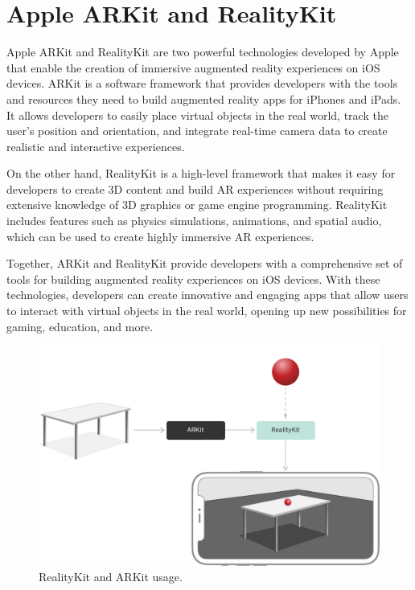 \documentclass[11pt,a4paper,oneside]{report}
\begin{document}
\section{Apple ARKit and RealityKit}

Apple ARKit and RealityKit are two powerful technologies developed by Apple that enable the creation of immersive augmented reality experiences on iOS devices. ARKit is a software framework that provides developers with the tools and resources they need to build augmented reality apps for iPhones and iPads. It allows developers to easily place virtual objects in the real world, track the user's position and orientation, and integrate real-time camera data to create realistic and interactive experiences.

On the other hand, RealityKit is a high-level framework that makes it easy for developers to create 3D content and build AR experiences without requiring extensive knowledge of 3D graphics or game engine programming. RealityKit includes features such as physics simulations, animations, and spatial audio, which can be used to create highly immersive AR experiences.

Together, ARKit and RealityKit provide developers with a comprehensive set of tools for building augmented reality experiences on iOS devices. With these technologies, developers can create innovative and engaging apps that allow users to interact with virtual objects in the real world, opening up new possibilities for gaming, education, and more.

\begin{figure}[!ht]
  \centering
  \includegraphics[width=\textwidth]{realitykit.png}
  \caption{RealityKit and ARKit usage.}
  \label{fig:TexnicCenter}
\end{figure}
\end{document}
